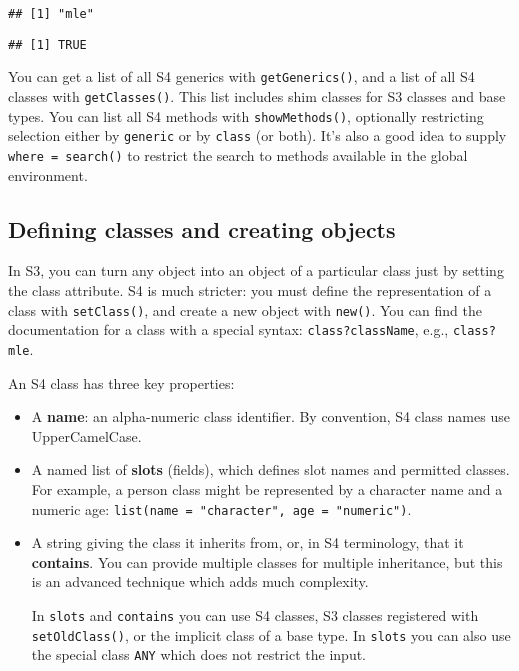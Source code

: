 \begin{verbatim}
## [1] "mle"
\end{verbatim}

\begin{Shaded}
\begin{Highlighting}[]
\NormalTok{)}
\end{Highlighting}
\end{Shaded}

\begin{verbatim}
## [1] TRUE
\end{verbatim}

You can get a list of all S4 generics with \texttt{getGenerics()}, and a
list of all S4 classes with \texttt{getClasses()}. This list includes
shim classes for S3 classes and base types. You can list all S4 methods
with \texttt{showMethods()}, optionally restricting selection either by
\texttt{generic} or by \texttt{class} (or both). It's also a good idea
to supply \texttt{where\ =\ search()} to restrict the search to methods
available in the global environment.

\hypertarget{defining-classes-and-creating-objects-1}{%
\subsection{Defining classes and creating
objects}\label{defining-classes-and-creating-objects-1}}

In S3, you can turn any object into an object of a particular class just
by setting the class attribute. S4 is much stricter: you must define the
representation of a class with \texttt{setClass()}, and create a new
object with \texttt{new()}. You can find the documentation for a class
with a special syntax: \texttt{class?className}, e.g.,
\texttt{class?mle}.  

An S4 class has three key properties:

\begin{itemize}
\item
  A \textbf{name}: an alpha-numeric class identifier. By convention, S4
  class names use UpperCamelCase.
\item
  A named list of \textbf{slots} (fields), which defines slot names and
  permitted classes. For example, a person class might be represented by
  a character name and a numeric age:
  \texttt{list(name\ =\ "character",\ age\ =\ "numeric")}. 
\item
  A string giving the class it inherits from, or, in S4 terminology,
  that it \textbf{contains}. You can provide multiple classes for
  multiple inheritance, but this is an advanced technique which adds
  much complexity.

  In \texttt{slots} and \texttt{contains} you can use S4 classes, S3
  classes registered with \texttt{setOldClass()}, or the implicit class
  of a base type. In \texttt{slots} you can also use the special class
  \texttt{ANY} which does not restrict the input.
\end{itemize}

